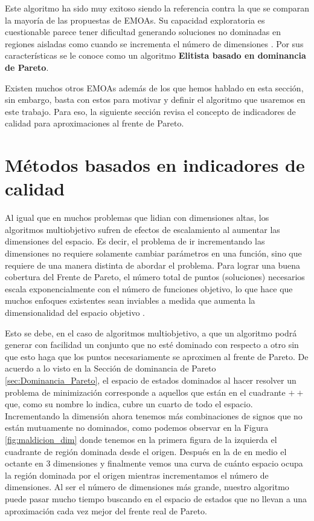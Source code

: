 Este algoritmo ha sido muy exitoso siendo la referencia contra la que se comparan la mayoría de las propuestas de EMOAs. Su capacidad exploratoria es cuestionable  parece tener dificultad generando soluciones no dominadas en regiones aisladas como cuando se incrementa el número de dimensiones \cite{coelloEvolutionaryAlgorithmsSolving}. Por sus características se le conoce como un algoritmo \textbf{Elitista basado en dominancia de Pareto}.

Existen muchos otros EMOAs además de los que hemos hablado en esta sección, sin embargo, basta con estos para motivar y definir el algoritmo que usaremos en este trabajo. Para eso, la siguiente sección revisa el concepto de indicadores de calidad para aproximaciones al frente de Pareto. 

\section{Métodos basados en indicadores de calidad} \label{sec:Metodos_QI}

Al igual que en muchos problemas que lidian con dimensiones altas, los algoritmos multiobjetivo sufren de efectos de escalamiento al aumentar las dimensiones del espacio. Es decir, el problema de ir incrementando las dimensiones no requiere solamente cambiar parámetros en una función, sino que requiere de una manera distinta de abordar el problema.
Para lograr una buena cobertura del Frente de Pareto, el número total de puntos (soluciones) necesarios escala exponencialmente con el número de funciones objetivo, lo que hace que muchos enfoques existentes sean inviables a medida que aumenta la dimensionalidad del espacio objetivo \cite{tanParetoOptimizationSmall2023}. 

Esto se debe, en el caso de algoritmos multiobjetivo, a que un algoritmo podrá generar con facilidad un conjunto que no esté dominado con respecto a otro sin que esto haga que los puntos necesariamente se aproximen al frente de Pareto. De acuerdo a lo visto en la Sección de dominancia de Pareto \ref{sec:Dominancia_Pareto}, el espacio de estados dominados al hacer resolver un problema de minimización corresponde a aquellos que están en el cuadrante $++$ que, como su nombre lo indica, cubre un cuarto de todo el espacio. Incrementando la dimensión ahora tenemos más combinaciones de signos que no están mutuamente no dominados, como podemos observar en la Figura \ref{fig:maldicion_dim} donde tenemos en la primera figura de la izquierda el cuadrante de región dominada desde el origen. Después en la de en medio el octante en 3 dimensiones y finalmente vemos una curva de cuánto espacio ocupa la región dominada por el origen mientras incrementamos el número de dimensiones. Al ser el número de dimensiones más grande, nuestro algoritmo puede pasar mucho tiempo buscando en el espacio de estados que no llevan a una aproximación cada vez mejor del frente real de Pareto. 

